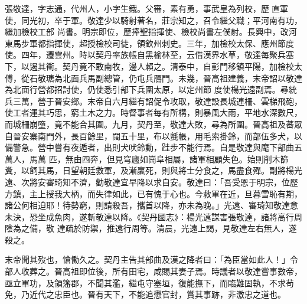 \begin{pinyinscope}
 張敬達，字志通，代州人，小字生鐵。父審，素有勇，事武皇為列校，歷直軍使，同光初，卒于軍。敬達少以騎射著名，莊宗知之，召令繼父職；平河南有功，繼加檢校工部
 尚書。明宗即位，歷捧聖指揮使、檢校尚書左僕射。長興中，改河東馬步軍都指揮使，超授檢校司徒，領欽州刺史。三年，加檢校太保、應州節度使。四年，遷雲州。時以契丹率族帳自黑榆林至，云借漢界水草，敬達每聚兵塞下，以遏其衝。契丹竟不敢南牧，邊人賴之。清泰中，自彭門移鎮平陽，加檢校太傅，從石敬瑭為北面兵馬副總管，仍屯兵鴈門。未幾，晉高祖建義，末帝詔以敬達為北面行營都招討使，仍使悉引部下兵圍太原，以定州節
 度使楊光遠副焉。尋統兵三萬，營于晉安鄉。末帝自六月繼有詔促令攻取，敬達設長城連柵、雲梯飛砲，使工者運其巧思，窮土木之力。時督事者每有所構，則暴風大雨，平地水深數尺，而城柵崩墮，竟不能合其圍。九月，契丹至，敬達大敗，尋為所圍。晉高祖及蕃眾自晉安寨南門外，長百餘里，闊五十里，布以氈帳，用毛索掛鈴，而部伍多犬，以備警急。營中嘗有夜遁者，出則犬吠鈴動，跬步不能行焉。自是敬達與麾下部曲五萬人，馬萬
 匹，無由四奔，但見穹廬如崗阜相屬，諸軍相顧失色。始則削木篩糞，以飼其馬，日望朝廷救軍，及漸羸死，則與將士分食之，馬盡食殫。副將楊光遠、次將安審琦知不濟，勸敬達宜早降以求自安。敬達曰：「吾受恩于明宗，位歷方鎮，主上授我大柄，而失律如此，已有愧于心也。今救軍在近，旦暮雪恥有期，諸公何相迫耶！待勢窮，則請殺吾，攜首以降，亦未為晚。」光遠、審琦知敬達意未決，恐坐成魚肉，遂斬敬達以降。《契丹國志》：楊光遠謀害張敬達，諸將高行周陰為之備，敬
 達疏於防禦，推遠行周等。清晨，光遠上謁，見敬達左右無人，遂殺之。



 末帝聞其歿也，愴慟久之。契丹主告其部曲及漢之降者曰：「為臣當如此人！」令部人收葬之。晉高祖即位後，所有田宅，咸賜其妻子焉。時議者以敬達嘗事數帝，亟立軍功，及領籓郡，不聞其濫，繼屯守塞垣，復能撫下，而臨難固執，不求茍免，乃近代之忠臣也。晉有天下，不能追懋官封，賞其事跡，非激忠之道也。



\end{pinyinscope}